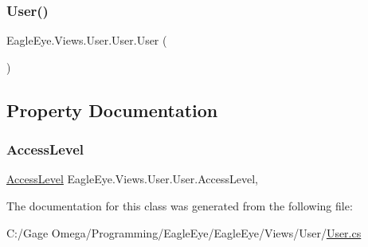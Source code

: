 \subsubsection{\texorpdfstring{User()}{User()}}
{\footnotesize\ttfamily Eagle\+Eye.\+Views.\+User.\+User.\+User (\begin{DoxyParamCaption}{ }\end{DoxyParamCaption})}



\subsection{Property Documentation}
\mbox{\label{class_eagle_eye_1_1_views_1_1_user_1_1_user_ad00af0bd442d99c28dd3068240226053}} 
\subsubsection{\texorpdfstring{AccessLevel}{AccessLevel}}
{\footnotesize\ttfamily \mbox{\hyperlink{namespace_eagle_eye_1_1_views_1_1_user_a5ec08150416703595770d50460878d89}{Access\+Level}} Eagle\+Eye.\+Views.\+User.\+User.\+Access\+Level\hspace{0.3cm}{\ttfamily [get]}, {\ttfamily [set]}}



The documentation for this class was generated from the following file\+:\begin{DoxyCompactItemize}
\item 
C\+:/\+Gage Omega/\+Programming/\+Eagle\+Eye/\+Eagle\+Eye/\+Views/\+User/\mbox{\hyperlink{_user_8cs}{User.\+cs}}\end{DoxyCompactItemize}
